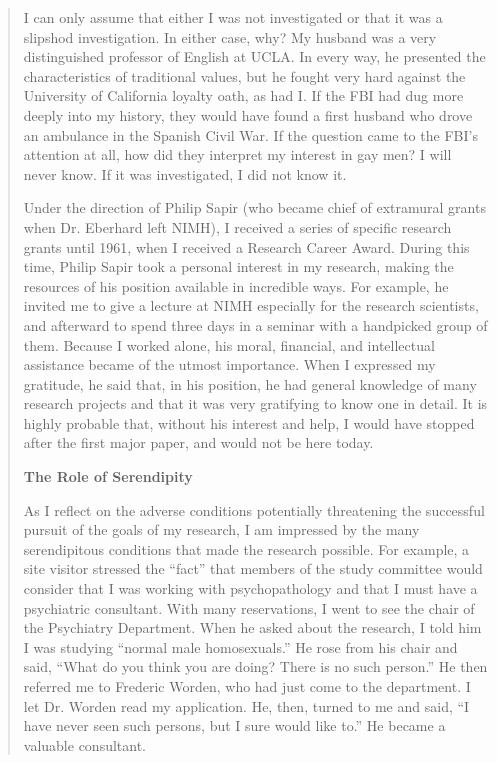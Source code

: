 \begin{refsection}
\begin{quote}
I can only assume that either I was not investigated or that it was a slipshod investigation. In either case, why? My husband was a very distinguished professor of English at UCLA. In every way, he presented the characteristics of traditional values, but he fought very hard against the University of California loyalty oath, as had I. If the FBI had dug more deeply into my history, they would have found a first husband who drove an ambulance in the Spanish Civil War. If the question came to the FBI's attention at all, how did they interpret my interest in gay men? I will never know. If it was investigated, I did not know it.

Under the direction of Philip Sapir (who became chief of extramural grants when Dr. Eberhard left NIMH), I received a series of specific research grants until 1961, when I received a Research Career Award. During this time, Philip Sapir took a personal interest in my research, making the resources of his position available in incredible ways. For example, he invited me to give a lecture at NIMH especially for the research scientists, and afterward to spend three days in a seminar with a handpicked group of them. Because I worked alone, his moral, financial, and intellectual assistance became of the utmost importance. When I expressed my gratitude, he said that, in his position, he had general knowledge of many research projects and that it was very gratifying to know one in detail. It is highly probable that, without his interest and help, I would have stopped after the first major paper, and would not be here today.

\textbf{The Role of Serendipity} 

As I reflect on the adverse conditions potentially threatening the successful pursuit of the goals of my research, I am impressed by the many serendipitous conditions that made the research possible. For example, a site visitor stressed the ``fact'' that members of the study committee would consider that I was working with psychopathology and that I must have a psychiatric consultant. With many reservations, I went to see the chair of the Psychiatry Department. When he asked about the research, I told him I was studying ``normal male homosexuals.'' He rose from his chair and said, ``What do you think you are doing? There is no such person.'' He then referred me to Frederic Worden, who had just come to the department. I let Dr. Worden read my application. He, then, turned to me and said, ``I have never seen such persons, but I sure would like to.'' He became a valuable consultant.


\end{quote}
\end{refsection}
